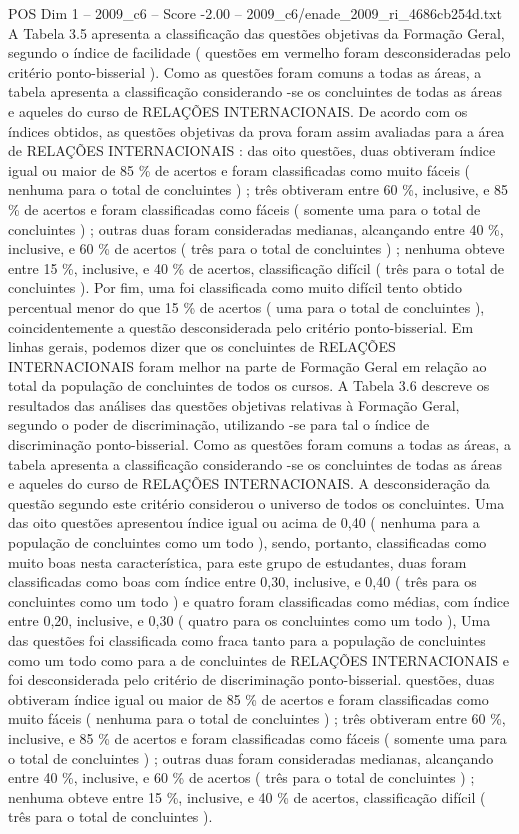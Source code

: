 \begin{textsample}{POS Dim 1 – 2009\_c6 – Score -2.00 – 2009\_c6/enade\_2009\_ri\_4686cb254d.txt}
A Tabela 3.5 apresenta a classificação das questões objetivas da Formação Geral, segundo o índice de facilidade ( questões em vermelho foram desconsideradas pelo critério ponto-bisserial ).
Como as questões foram comuns a todas as áreas, a tabela apresenta a classificação considerando -se os concluintes de todas as áreas e aqueles do curso de RELAÇÕES INTERNACIONAIS.
De acordo com os índices obtidos, as questões objetivas da prova foram assim avaliadas para a área de RELAÇÕES INTERNACIONAIS : das oito questões, duas obtiveram índice igual ou maior de 85 \% de acertos e foram classificadas como muito fáceis ( nenhuma para o total de concluintes ) ; três obtiveram entre 60 \%, inclusive, e 85 \% de acertos e foram classificadas como fáceis ( somente uma para o total de concluintes ) ; outras duas foram consideradas medianas, alcançando entre 40 \%, inclusive, e 60 \% de acertos ( três para o total de concluintes ) ; nenhuma obteve entre 15 \%, inclusive, e 40 \% de acertos, classificação difícil ( três para o total de concluintes ).
Por fim, uma foi classificada como muito difícil tento obtido percentual menor do que 15 \% de acertos ( uma para o total de concluintes ), coincidentemente a questão desconsiderada pelo critério ponto-bisserial.
Em linhas gerais, podemos dizer que os concluintes de RELAÇÕES INTERNACIONAIS foram melhor na parte de Formação Geral em relação ao total da população de concluintes de todos os cursos.
A Tabela 3.6 descreve os resultados das análises das questões objetivas relativas à Formação Geral, segundo o poder de discriminação, utilizando -se para tal o índice de discriminação ponto-bisserial.
Como as questões foram comuns a todas as áreas, a tabela apresenta a classificação considerando -se os concluintes de todas as áreas e aqueles do curso de RELAÇÕES INTERNACIONAIS.
A desconsideração da questão segundo este critério considerou o universo de todos os concluintes.
Uma das oito questões apresentou índice igual ou acima de 0,40 ( nenhuma para a população de concluintes como um todo ), sendo, portanto, classificadas como muito boas nesta característica, para este grupo de estudantes, duas foram classificadas como boas com índice entre 0,30, inclusive, e 0,40 ( três para os concluintes como um todo ) e quatro foram classificadas como médias, com índice entre 0,20, inclusive, e 0,30 ( quatro para os concluintes como um todo ), Uma das questões foi classificada como fraca tanto para a população de concluintes como um todo como para a de concluintes de RELAÇÕES INTERNACIONAIS e foi desconsiderada pelo critério de discriminação ponto-bisserial. questões, duas obtiveram índice igual ou maior de 85 \% de acertos e foram classificadas como muito fáceis ( nenhuma para o total de concluintes ) ; três obtiveram entre 60 \%, inclusive, e 85 \% de acertos e foram classificadas como fáceis ( somente uma para o total de concluintes ) ; outras duas foram consideradas medianas, alcançando entre 40 \%, inclusive, e 60 \% de acertos ( três para o total de concluintes ) ; nenhuma obteve entre 15 \%, inclusive, e 40 \% de acertos, classificação difícil ( três para o total de concluintes ).

\end{textsample}
